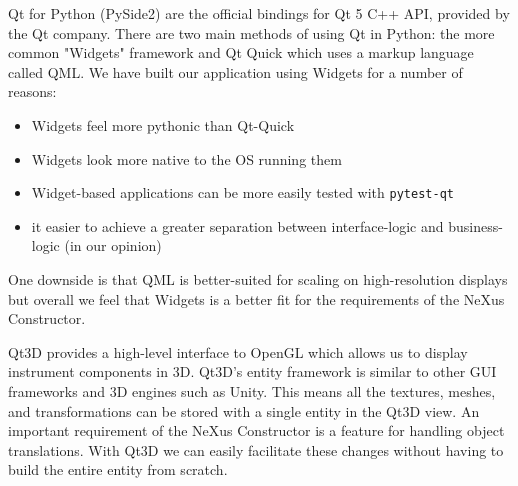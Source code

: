 Qt for Python (PySide2) are the official bindings for Qt 5 C++ API, provided by the Qt company. There are two main methods of using Qt in Python: the more common "Widgets" framework and Qt Quick which uses a markup language called QML. We have built our application using Widgets for a number of reasons: 
\begin{itemize}
\item Widgets feel more pythonic than Qt-Quick
\item Widgets look more native to the OS running them
\item Widget-based applications can be more easily tested with \texttt{pytest-qt}
\item it easier to achieve a greater separation between interface-logic and business-logic (in our opinion)
\end{itemize}

One downside is that QML is better-suited for scaling on high-resolution displays but overall we feel that Widgets is a better fit for the requirements of the NeXus Constructor.

Qt3D provides a high-level interface to OpenGL which allows us to display instrument components in 3D. Qt3D's entity framework is similar to other GUI frameworks and 3D engines such as Unity. This means all the textures, meshes, and transformations can be stored with a single entity in the Qt3D view. An important requirement of the NeXus Constructor is a feature for handling object translations. With Qt3D we can easily facilitate these changes without having to build the entire entity from scratch. 
\iffalse
\bigskip
The code snippet below shows the usage of a typical Qt3D view in python. Qt3D provides some high-level geometry types for adding cylinders, meshes, spheres as well as several other shapes. This is all wrapping OpenGL, and in the future Qt have stated they will support other graphics engines such as DirectX12, Vulkan and Metal. Currently there is some limited support for vulkan using the QVulkanWindow with a QVulkanInstance.
\fi
